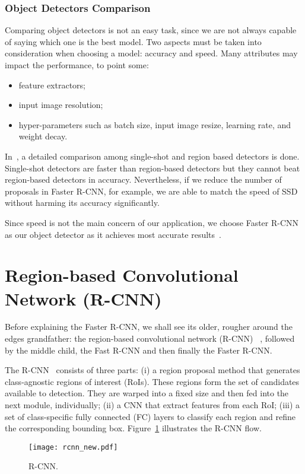 \subsubsection{Object Detectors Comparison}
%
Comparing object detectors is not an easy task, since we are not always capable of saying which one is the best model.
Two aspects must be taken into consideration when choosing a model: accuracy and speed.
Many attributes may impact the performance, to point some:
\begin{itemize}
 \item feature extractors;
 \item input image resolution;
 \item hyper-parameters such as batch size, input image resize, learning rate, and weight decay.
\end{itemize}

In~\cite{Huang2017}, a detailed comparison among single-shot and region based detectors is done.
Single-shot detectors are faster than region-based detectors
but they cannot beat region-based detectors in accuracy.
Nevertheless, if we reduce the number of proposals in Faster R-CNN, for example, we are able to match the speed of SSD without harming its accuracy significantly.

Since speed is not the main concern of our application, we choose Faster R-CNN as our object detector as it achieves most accurate results~\cite{Huang2017}.

\section{Region-based Convolutional Network (R-CNN)}
%
Before explaining the Faster R-CNN, we shall see its older, rougher around the edges grandfather:
the region-based convolutional network (R-CNN)~\cite{Girshick2016RCNN}
, followed by the middle child, the Fast R-CNN and then finally the Faster R-CNN.

The R-CNN~\cite{Girshick2016RCNN}
 consists of three parts:
(i) a region proposal method that generates class-agnostic regions of interest (RoIs).
These regions form the set of candidates available to detection.
They are warped into a fixed size and then fed into the next module, individually;
(ii) a CNN that extract features from each RoI;
(iii) a set of class-specific fully connected (FC)
layers to classify each region and refine the corresponding bounding box.
Figure~\ref{fig:R-CNN} illustrates the R-CNN flow.
%
%
\begin{figure}[th!]
	\centering
	\texttt{[image: rcnn\_new.pdf]}
	\caption{R-CNN.}
	\label{fig:R-CNN}
\end{figure}

